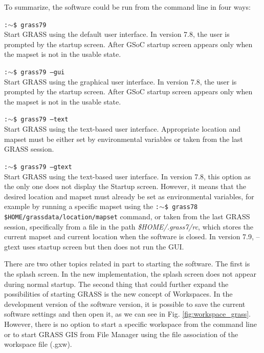 \documentclass[a4paper,10pt,twoside]{article}
\begin{document}
 \noindent To summarize, the software could be run from the command line in four ways:

\noindent \texttt{:$\sim$\$ grass79} \\
\noindent Start GRASS using the default user interface. In version 7.8, the user is prompted by the startup screen. After GSoC startup screen appears only when the mapset is not in the usable state.

\noindent \texttt{:$\sim$\$ grass79 --gui}\\
\noindent Start GRASS using the graphical user interface.  In version 7.8, the user is prompted by the startup screen. After GSoC startup screen appears only when the mapset is not in the usable state.

\noindent \texttt{:$\sim$\$ grass79 --text} \\
\noindent Start GRASS using the text-based user interface. Appropriate location and mapset must be either set by environmental variables or taken from the last GRASS session.

\noindent \texttt{:$\sim$\$ grass79 --gtext} \\
\noindent Start GRASS using the text-based user interface.  In version 7.8, this option as the only one does not display the Startup screen. However, it means that the desired location and mapset must already be set as environmental variables, for example by running a specific mapset using the \texttt{:$\sim$\$ grass78 \$HOME/grassdata/location/mapset} command, or taken from the last GRASS session, specifically from a file in the path \textit{\$HOME/.grass7/rc}, which stores the current mapset and current location when the software is closed.
In version 7.9, --gtext uses startup screen but then does not run the GUI.

There are two other topics related in part to starting the software. The first is the splash screen. In the new implementation, the splash screen does not appear during normal startup. The second thing that could further expand the possibilities of starting GRASS is the new concept of Workspaces. In the development version of the software version, it is possible to save the current software settings and then open it, as we can see in Fig. \ref {fig:workspace_grass}. However, there is no option to start a specific workspace from the command line or to start GRASS GIS from File Manager using the file association of the workspace file (.gxw).
\end{document}
